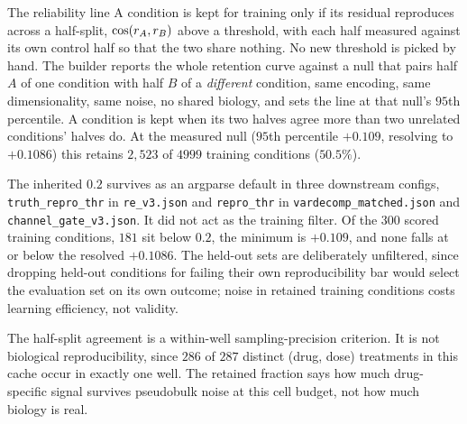 \begin{defn}{The reliability line}
A condition is kept for training only if its residual reproduces across a
half-split, $\cos(r_A, r_B)$ above a threshold, with each half
measured against its own control half so that the two share nothing. No new
threshold is picked by hand. The builder reports the whole retention curve
against a null that pairs half $A$ of one condition with half $B$ of a
\emph{different} condition, same encoding, same dimensionality, same noise, no
shared biology, and sets the line at that null's $95$th percentile. A condition
is kept when its two halves agree more than two unrelated conditions' halves do.
At the measured null ($95$th percentile $+0.109$, resolving to $+0.1086$) this
retains $2{,}523$ of $\num{4999}$ training conditions ($50.5\%$).
\end{defn}

The inherited $0.2$ survives as an argparse default in three downstream configs,
\texttt{truth\_repro\_thr} in \texttt{re\_v3.json} and \texttt{repro\_thr} in
\texttt{vardecomp\_matched.json} and \texttt{channel\_gate\_v3.json}. It did not
act as the training filter. Of the $\num{300}$ scored training conditions,
$\num{181}$ sit below $0.2$, the minimum is $+0.109$, and none falls at or below
the resolved $+0.1086$. The held-out sets are deliberately unfiltered, since
dropping held-out conditions for failing their own reproducibility bar would
select the evaluation set on its own outcome; noise in retained training
conditions costs learning efficiency, not validity.

The half-split agreement is a within-well sampling-precision criterion. It is not
biological reproducibility, since $\num{286}$ of $\num{287}$ distinct (drug,
dose) treatments in this cache occur in exactly one well. The retained fraction
says how much drug-specific signal survives pseudobulk noise at this cell budget,
not how much biology is real.

